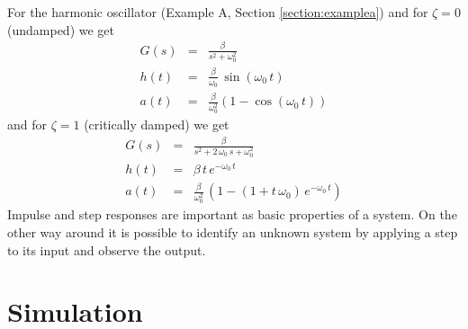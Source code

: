 \documentclass[a4paper,12pt]{article}
\newcommand{\Section}[2]{\section{#2}\label{section:#1}}
\newcommand{\SRef}[1]{Section \ref{section:#1}}
\begin{document}
For the harmonic oscillator (Example A, \SRef{examplea}) and for $\zeta=0$ (undamped) we get
\begin{eqnarray}
G(s)&=&\frac{\beta}{s^2+\omega_0^2}\\
h(t)&=&\frac{\beta}{\omega_0}\,\sin(\omega_0\,t)\\
a(t)&=&\frac{\beta}{\omega_0^2}\left(1-\cos(\omega_0\,t)\right)
\end{eqnarray}
and for $\zeta=1$ (critically damped) we get
\begin{eqnarray}
G(s)&=&\frac{\beta}{s^2+2\,\omega_0\,s+\omega_0^2}\\
h(t)&=&\beta\,t\,e^{-\omega_0\,t}\\
a(t)&=&\frac{\beta}{\omega_0^2}\,\left(1-\left(1+t\,\omega_0\right)\,e^{-\omega_0\,t}\right)
\end{eqnarray}
Impulse and step responses are important as basic properties of a system. On the other way around it is possible to identify an unknown system by applying a step to its input and observe the output.

\Section{simu}{Simulation}

\end{document}
